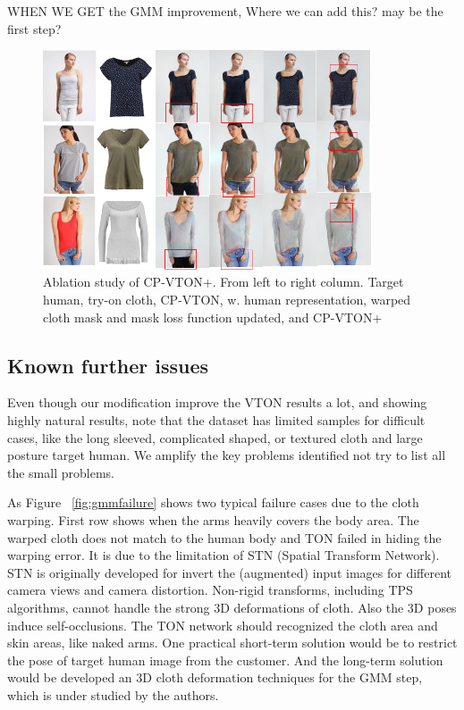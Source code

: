 \documentclass[runningheads]{llncs}
\begin{document}
WHEN WE GET the GMM improvement, Where we can add this? may be the first step?

\begin{figure}
\centering
\includegraphics[height=6.5cm, scale=1]{figures/ablation.png} 
\caption{Ablation study of CP-VTON+. From left to right column. Target human, try-on cloth, CP-VTON, w. human representation, warped cloth mask and mask loss function updated, and CP-VTON+
}
\label{fig:ablation}
\end{figure}



\subsection{Known further issues}


Even though our modification  improve the VTON results a lot, and showing highly natural results, note that the dataset has limited samples for difficult cases, like the long sleeved, complicated shaped, or textured cloth and large posture target human. We amplify the key problems identified not try to list all the small problems. 

As Figure ~\ref{fig:gmmfailure} shows two typical failure cases due to the cloth warping. First row shows when the arms heavily covers the body area. The warped cloth does not match to the human body and TON failed in hiding the warping error. It is due to the limitation of STN (Spatial Transform Network). STN is originally developed for invert the (augmented) input images for different camera views and camera distortion. Non-rigid transforms, including TPS algorithms, cannot handle the strong 3D deformations of cloth.  Also the 3D poses induce self-occlusions. The TON network should recognized the cloth area and skin areas, like naked arms. One practical short-term solution would be to restrict the pose of target human image from the customer. And the long-term solution would be developed an 3D cloth deformation techniques for the GMM step, which is under studied by the authors. 
\end{document}
